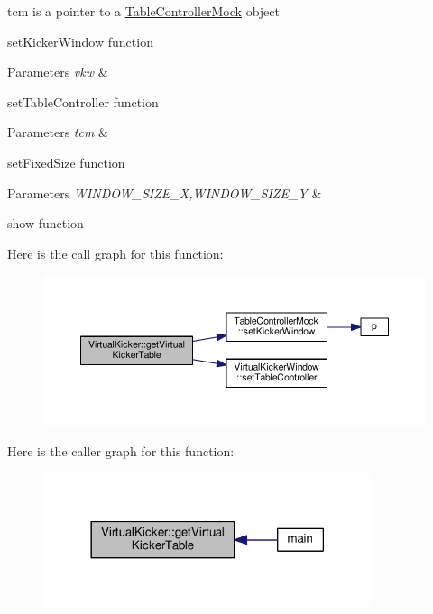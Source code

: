 tcm is a pointer to a \hyperlink{class_table_controller_mock}{Table\+Controller\+Mock} object

set\+Kicker\+Window function 
\begin{DoxyParams}{Parameters}
{\em vkw} & \\
\hline
\end{DoxyParams}
set\+Table\+Controller function 
\begin{DoxyParams}{Parameters}
{\em tcm} & \\
\hline
\end{DoxyParams}
set\+Fixed\+Size function 
\begin{DoxyParams}{Parameters}
{\em W\+I\+N\+D\+O\+W\+\_\+\+S\+I\+Z\+E\+\_\+X,W\+I\+N\+D\+O\+W\+\_\+\+S\+I\+Z\+E\+\_\+Y} & \\
\hline
\end{DoxyParams}
show function

Here is the call graph for this function\+:\nopagebreak
\begin{figure}[H]
\begin{center}
\leavevmode
\includegraphics[width=350pt]{class_virtual_kicker_ad59e6a68db914c8580f44e00d5015d76_cgraph}
\end{center}
\end{figure}




Here is the caller graph for this function\+:\nopagebreak
\begin{figure}[H]
\begin{center}
\leavevmode
\includegraphics[width=273pt]{class_virtual_kicker_ad59e6a68db914c8580f44e00d5015d76_icgraph}
\end{center}
\end{figure}




